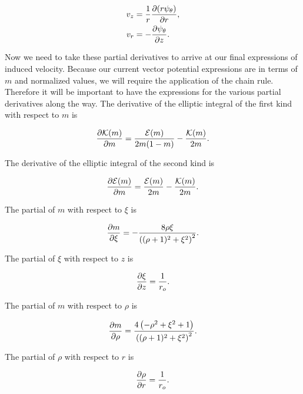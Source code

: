 \begin{subequations}
\begin{align}
    v_z &= \frac{1}{r}\frac{\partial (r\psi_\theta)}{\partial r}, \\
    v_r &= -\frac{\partial \psi_\theta}{\partial z}.
\end{align}
\end{subequations}


Now we need to take these partial derivatives to arrive at our final expressions of induced velocity.
%
Because our current vector potential expressions are in terms of \(m\) and normalized values, we will require the application of the chain rule.
%
Therefore it will be important to have the expressions for the various partial derivatives along the way.
%
The derivative of the elliptic integral of the first kind with respect to \(m\) is

\begin{equation}
    \label{eqn:dkdm}
    \frac{\partial \mathcal{K}(m)}{\partial m} = \frac{\mathcal{E}(m)}{2m(1-m)} - \frac{\mathcal{K}(m)}{2m}.
\end{equation}

\noindent The derivative of the elliptic integral of the second kind is

\begin{equation}
    \label{eqn:dkdm2}
    \frac{\partial \mathcal{E}(m)}{\partial m} = \frac{\mathcal{E}(m)}{2m} - \frac{\mathcal{K}(m)}{2m}.
\end{equation}

\noindent The partial of \(m\) with respect to \(\xi\) is

\begin{equation}
    \frac{\partial m}{\partial \xi} = - \frac{8 \rho \xi }{\left((\rho+1)^2+\xi^2\right)^2}.
\end{equation}

\noindent The partial of \(\xi\) with respect to \(z\) is

\begin{equation}
    \frac{\partial \xi}{\partial z} = \frac{1}{r_o}.
\end{equation}


\noindent The partial of \(m\) with respect to \(\rho\) is

\begin{equation}
    \frac{\partial m}{\partial \rho} = \frac{4\left(-\rho^2 + \xi^2 + 1\right)}{\left((\rho +1)^2 + \xi^2 \right)^2}.
\end{equation}

\noindent The partial of \(\rho\) with respect to \(r\) is

\begin{equation}
    \frac{\partial \rho}{\partial r} = \frac{1}{r_o}.
\end{equation}

